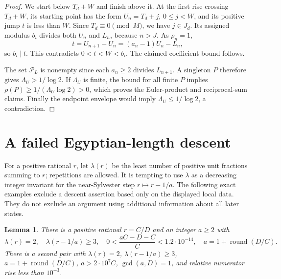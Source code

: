 \documentclass[11pt]{article}
\newtheorem{lemma}{Lemma}
\begin{document}
\begin{proof}
We start below $T_d+W$ and finish above it. At the first rise crossing
$T_d+W$, its starting point has the form $U_n=T_d+j$, $0\le j<W$,
and its positive jump $t$ is less than $W$. Since $T_d\equiv0\pmod M$,
we have $j\in J_d$. Its assigned modulus $b_i$ divides both $U_n$
and $L_n$, because $n>J$. As $\rho_n=1$,
\[
 t=U_{n+1}-U_n=(a_n-1)U_n-L_n,
\]
so $b_i\mid t$. This contradicts $0<t<W<b_i$.
The claimed coefficient bound follows.

The set $\mathcal P_L$ is nonempty since each $a_n\ge2$ divides
$L_{n+1}$. A singleton $P$ therefore gives $\Lambda_U>1/\log2$.
If $\Lambda_U$ is finite, the bound for all finite $P$ implies
$\rho(P)\ge1/(\Lambda_U\log2)>0$, which proves the Euler-product
and reciprocal-sum claims. Finally the endpoint envelope would imply
$\Lambda_U\le1/\log2$, a contradiction.
\end{proof}

\section{A failed Egyptian-length descent}
For a positive rational $r$, let $\lambda(r)$ be the least number of
positive unit fractions summing to $r$; repetitions are allowed.
It is tempting to use $\lambda$ as a decreasing integer invariant for
the near-Sylvester step $r\mapsto r-1/a$.
The following exact examples exclude a descent assertion based only
on the displayed local data. They do not exclude an argument using
additional information about all later states.

\begin{lemma}\label{lem:lengthfailure}
There is a positive rational $r=C/D$ and an integer $a\ge2$ with
\[
 \lambda(r)=2,\quad \lambda(r-1/a)\ge3,\quad
 0<\frac{aC-D-C}{C}<1.2\cdot10^{-14},
 \quad a=1+\operatorname{round}(D/C).
\]
There is a second pair with $\lambda(r)=2$, $\lambda(r-1/a)\ge3$,
$a=1+\operatorname{round}(D/C)$, $a>2\cdot10^7 C$,
$\gcd(a,D)=1$, and relative numerator rise less than $10^{-3}$.
\end{lemma}
\end{document}
